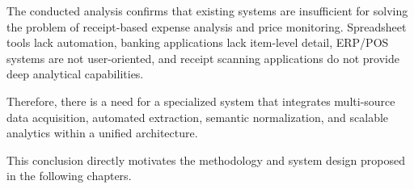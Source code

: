 The conducted analysis confirms that existing systems are insufficient for solving the problem of receipt-based expense analysis and price monitoring. Spreadsheet tools lack automation, banking applications lack item-level detail, ERP/POS systems are not user-oriented, and receipt scanning applications do not provide deep analytical capabilities.

Therefore, there is a need for a specialized system that integrates multi-source data acquisition, automated extraction, semantic normalization, and scalable analytics within a unified architecture.

This conclusion directly motivates the methodology and system design proposed in the following chapters.
%


